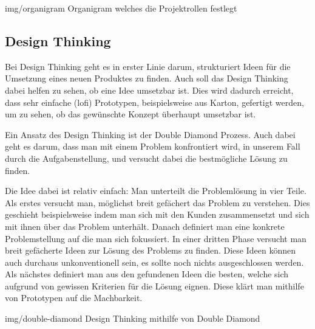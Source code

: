 \image
  {img/organigram}
  {Organigram welches die Projektrollen festlegt}

\subsection{Design Thinking}
\label{sec:design-thinking}

Bei Design Thinking \cite{Wikipedia-Design-Thinking} geht es in erster Linie darum, strukturiert 
Ideen für die Umsetzung eines neuen Produktes zu finden. Auch soll das Design Thinking
dabei helfen zu sehen, ob eine Idee umsetzbar ist. Dies wird dadurch erreicht,
dass sehr einfache (\acrshort{lofi}) Prototypen, beispielsweise aus Karton, 
gefertigt werden, um zu sehen, ob das gewünschte Konzept überhaupt umsetzbar ist.

Ein Ansatz des Design Thinking ist der Double Diamond Prozess. Auch dabei geht es
darum, dass man mit einem Problem konfrontiert wird, in unserem Fall durch die 
Aufgabenstellung, und versucht dabei die bestmögliche Lösung zu finden.

Die Idee dabei ist relativ einfach: Man unterteilt die Problemlösung in vier Teile.
Als erstes versucht man, möglichst breit gefächert das Problem zu verstehen. Dies geschieht
beispielsweise indem man sich mit den Kunden zusammensetzt und sich mit ihnen über das Problem unterhält.
Danach definiert man eine konkrete Problemstellung auf die man sich fokussiert.
In einer dritten Phase versucht man breit gefächerte Ideen zur Lösung des Problems zu finden.
Diese Ideen können auch durchaus unkonventionell sein, es sollte noch nichts ausgeschlossen werden.
Als nächstes definiert man aus den gefundenen Ideen
die besten, welche sich aufgrund von gewissen Kriterien für die Lösung eignen.
Diese klärt man mithilfe von Prototypen auf die Machbarkeit.

\image
  {img/double-diamond}
  {Design Thinking mithilfe von Double Diamond}